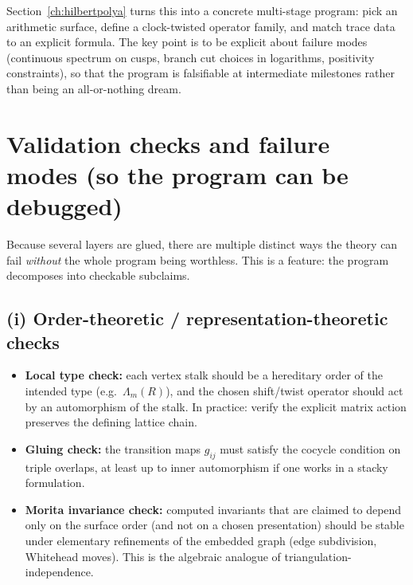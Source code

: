 \documentclass[11pt,oneside]{amsbook}
\numberwithin{equation}{section}
\theoremstyle{plain}
\theoremstyle{definition}
\theoremstyle{remark}
\begin{document}
Section~\ref{ch:hilbertpolya} turns this into a concrete multi-stage program:
pick an arithmetic surface, define a clock-twisted operator family, and match trace data to an explicit formula.
The key point is to be explicit about failure modes (continuous spectrum on cusps, branch cut choices in logarithms, positivity constraints),
so that the program is falsifiable at intermediate milestones rather than being an all-or-nothing dream.
\section*{Validation checks and failure modes (so the program can be debugged)}

Because several layers are glued, there are multiple distinct ways the theory can fail \emph{without} the whole program being worthless.
This is a feature: the program decomposes into checkable subclaims.

\subsection*{(i) Order-theoretic / representation-theoretic checks}
\begin{itemize}
\item \textbf{Local type check:} each vertex stalk should be a hereditary order of the intended type (e.g.\ $\Lambda_m(R)$), and the chosen shift/twist operator should act by an automorphism of the stalk. In practice: verify the explicit matrix action preserves the defining lattice chain.
\item \textbf{Gluing check:} the transition maps $g_{ij}$ must satisfy the cocycle condition on triple overlaps, at least up to inner automorphism if one works in a stacky formulation.
\item \textbf{Morita invariance check:} computed invariants that are claimed to depend only on the surface order (and not on a chosen presentation) should be stable under elementary refinements of the embedded graph (edge subdivision, Whitehead moves). This is the algebraic analogue of triangulation-independence.
\end{itemize}
\end{document}
